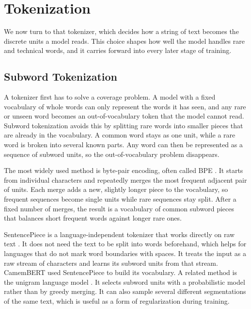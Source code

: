 \section{Tokenization}
\label{sec:lm-tokenization}

We now turn to that tokenizer, which decides how a string of text becomes the discrete
units a model reads. This choice shapes how well the model handles rare and
technical words, and it carries forward into every later stage of training.

\subsection{Subword Tokenization}

A tokenizer first has to solve a coverage problem. A model with a fixed vocabulary of
whole words can only represent the words it has seen, and any rare or unseen word becomes
an out-of-vocabulary token that the model cannot read. Subword tokenization avoids this by
splitting rare words into smaller pieces that are already in the vocabulary. A common word
stays as one unit, while a rare word is broken into several known parts. Any word can then
be represented as a sequence of subword units, so the out-of-vocabulary problem
disappears.

The most widely used method is byte-pair encoding, often called BPE
\citep{sennrich-etal-2016-neural}. It starts from individual characters and repeatedly
merges the most frequent adjacent pair of units. Each merge adds a new, slightly longer
piece to the vocabulary, so frequent sequences become single units while rare sequences
stay split. After a fixed number of merges, the result is a vocabulary of common subword
pieces that balances short frequent words against longer rare ones.

SentencePiece is a language-independent tokenizer that works directly on raw text
\citep{kudo_sentencepiece_2018}. It does not need the text to be split into words
beforehand, which helps for languages that do not mark word boundaries with spaces. It
treats the input as a raw stream of characters and learns its subword units from that
stream. CamemBERT used SentencePiece to build its vocabulary. A related method is the
unigram language model \citep{kudo-2018-subword}. It selects subword units with a
probabilistic model rather than by greedy merging. It can also sample several different
segmentations of the same text, which is useful as a form of regularization during
training.

